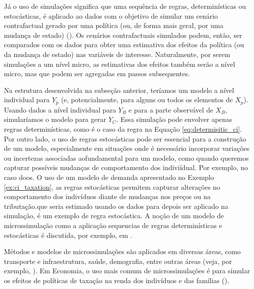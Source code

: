 \documentclass[12pt, a4paper, openany]{book}
\numberwithin{equation}{chapter}
\numberwithin{table}{chapter}
\numberwithin{figure}{chapter}
\theoremstyle{break}
\begin{document}
Já o uso de simulações significa que uma sequência de regras, determinísticas ou estocásticas, é aplicado ao dados com o objetivo de simular um cenário contrafactual gerado por uma política (ou, de forma mais geral, por uma mudança de estado) (\cite{figari2015}). Os cenários contrafactuais simulados podem, então, ser comparados com os dados para obter uma estimativa dos efeitos da política (ou da mudança de estado) nas variáveis de interesse. Naturalmente, por serem simulações a um nível micro, as estimativas dos efeitos também serão a nível micro, mas que podem ser agregadas em passos subsequentes.

Na estrutura desenvolvida na subseção anterior, teríamos um modelo a nível individual para $Y_p$ (e, potencialmente, para alguns ou todos os elementos de $X_p$). Usando dados a nível individual para $Y_B$ e para a parte observável de $X_B$, simularíamos o modelo para gerar $Y_C$. Essa simulação pode envolver apenas regras determinísticas, como é o caso da regra na Equação \eqref{eq:determisitic_ci}. Por outro lado, o uso de regras estocásticas pode ser essencial para a construção de um modelo, especialmente em situações onde é necessário incorporar variações ou incertezas associadas aofundamental para um modelo, como quando queremos capturar possíveis mudanças de comportamento dos indiviídual. Por exemplo, no caso doos. O uso de um modelo de demanda apresentado no Exemplo \ref{ex:ci_taxation}, as regras estocásticas permitem capturar alterações no comportamento dos indivíduos diante de mudanças nos preços ou na tributação.que seria estimado usando os dados para depois ser aplicado na simulação, é um exemplo de regra estocástica. A noção de um modelo de microssimulação como a aplicação sequencias de regras determinísticas e estocásticas é discutida, por exemplo, em \textcite[capítulo~2]{odonoghue2021}.

Métodos e modelos de microssimulações são aplicados em diversas áreas, como transporte e infraestrutura, saúde, demografia, entre outras áreas (veja, por exemplo, \cite{o2014handbook}). Em Economia, o uso mais comum de microssimulações é para simular os efeitos de políticas de taxação na renda dos indivíduos e das famílias (\cite[capítulo~1]{odonoghue2021}). 
\end{document}
